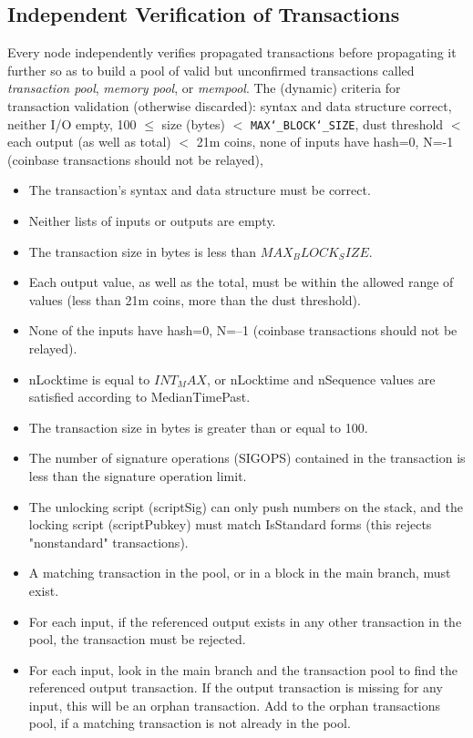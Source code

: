 \documentclass[english, 11pt]{article}
\begin{document}
\subsection{Independent Verification of Transactions}
\noindent Every node independently verifies propagated transactions before propagating it further so as to build a pool of valid but unconfirmed transactions called \textit{transaction pool}, \textit{memory pool}, or \textit{mempool}. The (dynamic) criteria for transaction validation (otherwise discarded): syntax and data structure correct, neither I/O empty, 100 $\leq$ size (bytes) $<$ \texttt{MAX\char`_BLOCK\char`_SIZE}, dust threshold $<$ each output (as well as total) $<$ 21m coins, none of inputs have hash=0, N=-1 (coinbase transactions should not be relayed), 

\begin{itemize}
    \item The transaction’s syntax and data structure must be correct.
    \item Neither lists of inputs or outputs are empty.
    \item The transaction size in bytes is less than $MAX_BLOCK_SIZE$.
    \item Each output value, as well as the total, must be within the allowed range of values (less than 21m coins, more than the dust threshold).
    \item None of the inputs have hash=0, N=–1 (coinbase transactions should not be relayed).
    \item nLocktime is equal to $INT_MAX$, or nLocktime and nSequence values are satisfied according to MedianTimePast.
    \item The transaction size in bytes is greater than or equal to 100.
    \item The number of signature operations (SIGOPS) contained in the transaction is less than the signature operation limit.
    \item The unlocking script (scriptSig) can only push numbers on the stack, and the locking script (scriptPubkey) must match IsStandard forms (this rejects "nonstandard" transactions).
    \item A matching transaction in the pool, or in a block in the main branch, must exist.
    \item For each input, if the referenced output exists in any other transaction in the pool, the transaction must be rejected.
    \item For each input, look in the main branch and the transaction pool to find the referenced output transaction. If the output transaction is missing for any input, this will be an orphan transaction. Add to the orphan transactions pool, if a matching transaction is not already in the pool.

\end{itemize}
\end{document}
